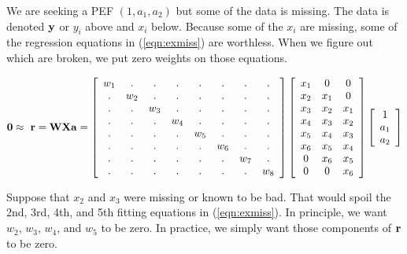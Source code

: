 \par
We are seeking a PEF $(1,a_1,a_2)$
but some of the data is missing.
The data is denoted $\bold y$ or $y_i$ above and $x_i$ below.
Because some of the  $x_i$ are missing,
some of the regression equations in (\ref{eqn:exmiss}) are worthless.
When we figure out which are broken, we put zero weights on those equations.


\begin{equation}
\bold 0
 \approx\ \bold r = \bold W \bold X \bold a =
\left[
        \begin{array}{cccccccc}
          w_1& . & . & . & . & . & . & .  \\
           . &w_2& . & . & . & . & . & .  \\
           . & . &w_3& . & . & . & . & .  \\
           . & . & . &w_4& . & . & . & .  \\
           . & . & . & . &w_5& . & . & .  \\
           . & . & . & . & . &w_6& . & .  \\
           . & . & . & . & . & . &w_7& .  \\
           . & . & . & . & . & . & . &w_8
          \end{array}
\right]
        \left[
        \begin{array}{ccc}
          x_1 & 0   & 0    \\
          x_2 & x_1 & 0    \\
          x_3 & x_2 & x_1  \\
          x_4 & x_3 & x_2  \\
          x_5 & x_4 & x_3  \\
          x_6 & x_5 & x_4  \\
          0   & x_6 & x_5  \\
          0   & 0   & x_6
          \end{array} \right]
        \left[
        \begin{array}{c}
          1   \\
          a_1 \\
          a_2 \end{array} \right]
\label{eqn:exmiss}
\end{equation}

\par
Suppose that $x_2$ and $x_3$ were missing or known to be bad.
That would spoil the 2nd, 3rd, 4th, and 5th fitting equations
in (\ref{eqn:exmiss}).
In principle, we want $w_2$, $w_3$, $w_4$, and $w_5$ to be zero.
In practice, we simply want those components of $\bold r$ to be zero.

